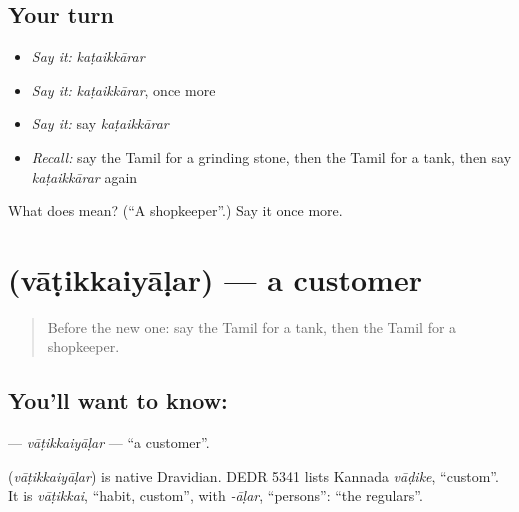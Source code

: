 \subsection*{Your turn}
\begin{itemize}
\raggedright
  \item \emph{Say it:} \emph{kaṭaikkārar}
  \item \emph{Say it:} \emph{kaṭaikkārar}, once more
  \item \emph{Say it:} say \emph{kaṭaikkārar}
  \item \emph{Recall:} say the Tamil for a grinding stone, then the Tamil for a tank, then say \emph{kaṭaikkārar} again
\end{itemize}

\begin{tcolorbox}[breakable,colback=teal!4,colframe=teal!35!black,title={Before you move on}]
What does  mean? (\textquotedblleft{}A shopkeeper\textquotedblright{}.) Say it once more.
\end{tcolorbox}
\section[\texorpdfstring{\ta{வாடிக்கையாளர்} (vāṭikkaiyāḷar)}{வாடிக்கையாளர் (vāṭikkaiyāḷar)}]{ (vāṭikkaiyāḷar) — a customer}

\label{lesson:TA-C191-vatikkaiyalar}



\begin{quote}
Before the new one: say the Tamil for a tank, then the Tamil for a shopkeeper.
\end{quote}

\subsection*{You'll want to know: }
\textbf{} — \emph{vāṭikkaiyāḷar} — \textquotedblleft{}a customer\textquotedblright{}.

\begin{cousinweb}
\textbf{} (\emph{vāṭikkaiyāḷar}) is native Dravidian. DEDR 5341 lists Kannada \emph{vāḍike}, \textquotedblleft{}custom\textquotedblright{}. It is \emph{vāṭikkai}, \textquotedblleft{}habit, custom\textquotedblright{}, with \emph{-āḷar}, \textquotedblleft{}persons\textquotedblright{}: \textquotedblleft{}the regulars\textquotedblright{}.
\end{cousinweb}

